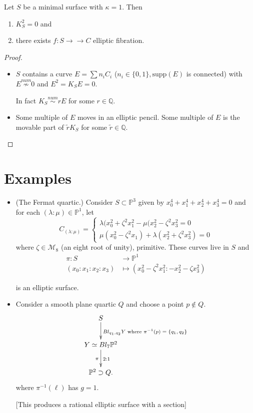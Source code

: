 \begin{proposition}
\label{proposition-minimal-surface}
Let $S$ be a minimal surface with $\kappa=1$.
Then
\begin{enumerate}
\item $K^2_S=0$ and
\item there exists $f:S
\to\!\!\!\!\!\to C$ elliptic
fibration.
\end{enumerate}
\end{proposition}

\begin{proof}
\begin{itemize}
\item $S$ contains a curve
$E= \sum n_iC_i$
($n_i \in \{ 0,1\}, \text{supp}(E)$ is
connected)
with $E \overset{num}{\not \sim}0$
and $E^2=K_S E=0$.

In fact $K_S \overset{num}{\sim} rE$ for some
$r \in \mathbb{Q}$.

\item Some multiple of $E$ moves in an
elliptic pencil.
Some multiple of $E$ is the movable part of
$\tilde{r}K_S$
for some $\tilde{r} \in \mathbb{Q}$.
\end{itemize}
\end{proof}

\section{Examples}
\label{section-examples}

\begin{itemize}
\item (The Fermat quartic.)
Consider $S \subset \mathbb{P}^3$
given by $x_0^4+x_1^4+x_2^4+x_3^4=0$
and for each $(\lambda:\mu) \in
\mathbb{P}^1$,
let
$$
C_{(\lambda:\mu)}
=\begin{cases}
\lambda(x_0^2+\zeta^2x_1^2-\mu(x_2^2-
\zeta^2x_3^2=0\\
\mu(x_0^2-\zeta^2x_1)+\lambda(x_2^2+
\zeta^2x_3^2)=0
\end{cases}
$$
where $\zeta \in \mathcal{M}_8$
(an eight root of unity), primitive.
These curves live in $S$ and
$$
\begin{aligned}
\pi: S &\longrightarrow \mathbb{P}^1 \\
(x_0:x_1:x_2:x_3) &\longmapsto
(x_0^2-\zeta^2x_1^2:-x_2^2-\zeta x_3^2)
\end{aligned}
$$

\noindent
is an elliptic surface.

\item Consider a smooth plane quartic $Q$
and choose a point $p \not\in Q$.
$$
\xymatrix{
S \ar[d]^{Bl_{q_1,q_2}Y \text{ where
$\pi^{-1}(p)=\{q_1,q_2\}$}}\\
Y \simeq Bl_7\mathbb{P}^2\ar[d]_\pi^{2:1}\\
\mathbb{P}^2 \supset Q.
}
$$
where $\pi^{-1}(\ell)$ has $g=1$.

[This produces a rational elliptic surface
with a section]
\end{itemize}

